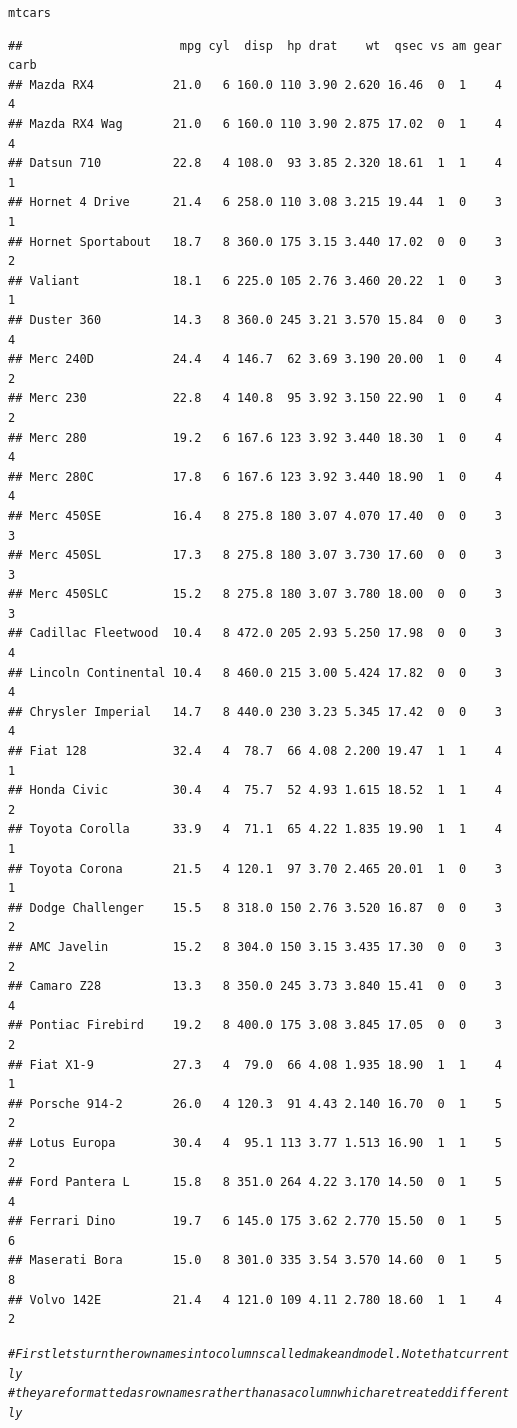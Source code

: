\documentclass{article}\usepackage[]{graphicx}\usepackage[]{xcolor}
\makeatletter
\newcommand{\hlcom}[1]{\textcolor[rgb]{0.678,0.584,0.686}{\textit{#1}}}%
\newcommand{\hlstd}[1]{\textcolor[rgb]{0.345,0.345,0.345}{#1}}%
\newenvironment{kframe}{%
 \def\at@end@of@kframe{}%
 \ifinner\ifhmode%
  \def\at@end@of@kframe{\end{minipage}}%
  \begin{minipage}{\columnwidth}%
 \fi\fi%
 \def\FrameCommand##1{\hskip\@totalleftmargin \hskip-\fboxsep
 \colorbox{shadecolor}{##1}\hskip-\fboxsep
     \hskip-\linewidth \hskip-\@totalleftmargin \hskip\columnwidth}%
 \MakeFramed {\advance\hsize-\width
   \@totalleftmargin\z@ \linewidth\hsize
   \@setminipage}}%
 {\par\unskip\endMakeFramed%
 \at@end@of@kframe}
\newenvironment{knitrout}{}{} %
\makeatother
\begin{document}
\begin{knitrout}
\begin{kframe}
\begin{alltt}
\hlstd{mtcars}
\end{alltt}
\begin{verbatim}
##                      mpg cyl  disp  hp drat    wt  qsec vs am gear carb
## Mazda RX4           21.0   6 160.0 110 3.90 2.620 16.46  0  1    4    4
## Mazda RX4 Wag       21.0   6 160.0 110 3.90 2.875 17.02  0  1    4    4
## Datsun 710          22.8   4 108.0  93 3.85 2.320 18.61  1  1    4    1
## Hornet 4 Drive      21.4   6 258.0 110 3.08 3.215 19.44  1  0    3    1
## Hornet Sportabout   18.7   8 360.0 175 3.15 3.440 17.02  0  0    3    2
## Valiant             18.1   6 225.0 105 2.76 3.460 20.22  1  0    3    1
## Duster 360          14.3   8 360.0 245 3.21 3.570 15.84  0  0    3    4
## Merc 240D           24.4   4 146.7  62 3.69 3.190 20.00  1  0    4    2
## Merc 230            22.8   4 140.8  95 3.92 3.150 22.90  1  0    4    2
## Merc 280            19.2   6 167.6 123 3.92 3.440 18.30  1  0    4    4
## Merc 280C           17.8   6 167.6 123 3.92 3.440 18.90  1  0    4    4
## Merc 450SE          16.4   8 275.8 180 3.07 4.070 17.40  0  0    3    3
## Merc 450SL          17.3   8 275.8 180 3.07 3.730 17.60  0  0    3    3
## Merc 450SLC         15.2   8 275.8 180 3.07 3.780 18.00  0  0    3    3
## Cadillac Fleetwood  10.4   8 472.0 205 2.93 5.250 17.98  0  0    3    4
## Lincoln Continental 10.4   8 460.0 215 3.00 5.424 17.82  0  0    3    4
## Chrysler Imperial   14.7   8 440.0 230 3.23 5.345 17.42  0  0    3    4
## Fiat 128            32.4   4  78.7  66 4.08 2.200 19.47  1  1    4    1
## Honda Civic         30.4   4  75.7  52 4.93 1.615 18.52  1  1    4    2
## Toyota Corolla      33.9   4  71.1  65 4.22 1.835 19.90  1  1    4    1
## Toyota Corona       21.5   4 120.1  97 3.70 2.465 20.01  1  0    3    1
## Dodge Challenger    15.5   8 318.0 150 2.76 3.520 16.87  0  0    3    2
## AMC Javelin         15.2   8 304.0 150 3.15 3.435 17.30  0  0    3    2
## Camaro Z28          13.3   8 350.0 245 3.73 3.840 15.41  0  0    3    4
## Pontiac Firebird    19.2   8 400.0 175 3.08 3.845 17.05  0  0    3    2
## Fiat X1-9           27.3   4  79.0  66 4.08 1.935 18.90  1  1    4    1
## Porsche 914-2       26.0   4 120.3  91 4.43 2.140 16.70  0  1    5    2
## Lotus Europa        30.4   4  95.1 113 3.77 1.513 16.90  1  1    5    2
## Ford Pantera L      15.8   8 351.0 264 4.22 3.170 14.50  0  1    5    4
## Ferrari Dino        19.7   6 145.0 175 3.62 2.770 15.50  0  1    5    6
## Maserati Bora       15.0   8 301.0 335 3.54 3.570 14.60  0  1    5    8
## Volvo 142E          21.4   4 121.0 109 4.11 2.780 18.60  1  1    4    2
\end{verbatim}
\begin{alltt}
\hlcom{# First lets turn the row names into columns called make and model. Note that currently}
\hlcom{# they are formatted as rownames rather than as a column which are treated differently}


\end{alltt}
\end{kframe}
\end{knitrout}
\end{document}
